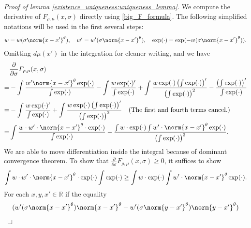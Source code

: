 \begin{proof}[Proof of lemma \ref{existence_uniqueness:uniqueness_lemma}]
    We compute the derivative of $F_{\rho,\mu}(x,\sigma)$ directly using \eqref{big_F_formula}. The following simplified
    notations will be used in the first several steps:
    \begin{align}
        w = w(\sigma\norm{x-x'}^{\theta}), \quad w'=w'(\sigma\norm{x-x'}^{\theta}), \quad \exp(\cdot) = \exp(-w(\sigma\norm{x-x'}^{\theta})).
    \end{align}
    Omitting $d\mu(x')$ in the integration for cleaner writing, and we have
    \begin{align}
          & \frac{\partial}{\partial \sigma} F_{\rho,\mu}(x,\sigma) \nonumber                                                                                                                                    \\
        = & -\int \frac{w'\norm{x-x'}^{\theta}\exp(\cdot)}{\int \exp(\cdot)} -\int \frac{w\exp(\cdot)'}{\int \exp(\cdot)} +
        \int \frac{w \exp(\cdot) \left(\int \exp(\cdot)\right)'}{\left(\int \exp(\cdot)\right)^2} - \frac{\left(\int \exp(\cdot)\right)'}{\int \exp(\cdot)} \nonumber                                            \\
        = & -\int \frac{w\exp(\cdot)'}{\int \exp(\cdot)} +
        \int \frac{w \exp(\cdot) \left(\int \exp(\cdot)\right)'}{\left(\int \exp(\cdot)\right)^2} \quad \text{\normalfont (The first and fourth terms cancel.)} \nonumber                                        \\
        = & \int \frac{w\cdot w' \cdot \norm{x-x'}^{\theta} \cdot \exp(\cdot)}{\int \exp(\cdot)}-\frac{\int w \cdot \exp(\cdot) \int w'\cdot \norm{x-x'}^{\theta} \exp(\cdot)}{\left(\int \exp(\cdot)\right)^2}.
    \end{align}
    We are able to move differentiation inside the integral because of dominant convergence theorem. To show that $\frac{\partial}{\partial \sigma} F_{\rho,\mu}(x,\sigma) \geq 0$, it suffices to show
    \begin{align} \label{monotone_inequ}
        \int w\cdot w' \cdot \norm{x-x'}^{\theta} \cdot \exp(\cdot) \int \exp(\cdot) \geq \int w \cdot \exp(\cdot) \int w'\cdot \norm{x-x'}^{\theta} \exp(\cdot).
    \end{align}
    For each $x,y,x' \in \mathbb{R}$ if the equality
    \begin{align} \label{monotone_condition}
         & (w'(\sigma\norm{x-x'}^{\theta})\norm{x-x'}^{\theta}-w'(\sigma\norm{y-x'}^{\theta})\norm{y-x'}^{\theta}) \nonumber                                   \\

\end{align}
\end{proof}
